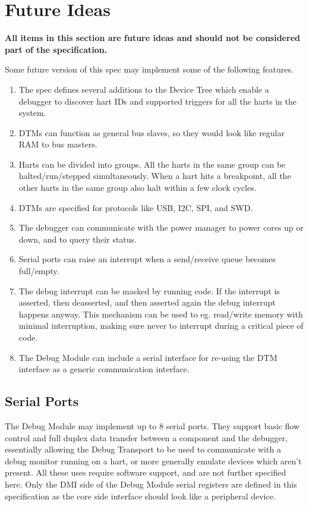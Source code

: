 \chapter{Future Ideas}
\label{sec:future}

\textbf{All items in this section are future ideas and should not be considered part of the specification.}

Some future version of this spec may implement some of the following features.

\begin{enumerate}
   \item The spec defines several additions to the Device Tree which enable a
      debugger to discover hart IDs and supported triggers for all the harts
      in the system.
   \item DTMs can function as general bus slaves, so they would look like
      regular RAM to bus masters.
   \item Harts can be divided into groups. All the harts in the same group can
      be halted/run/stepped simultaneously. When a hart hits a breakpoint, all
      the other harts in the same group also halt within a few clock cycles.
   \item DTMs are specified for protocols like USB, I2C, SPI, and SWD.
   \item The debugger can communicate with the power manager to power cores up
      or down, and to query their status.
   \item Serial ports can raise an interrupt when a send/receive queue becomes full/empty.
   \item The debug interrupt can be masked by running code. If the interrupt is
      asserted, then deasserted, and then asserted again the debug interrupt
      happens anyway. This mechanism can be used to eg. read/write memory with
      minimal interruption, making sure never to interrupt during a critical
      piece of code.
   \item The Debug Module can include a serial interface for re-using
      the DTM interface as a generic communication interface.
\end{enumerate}

\section{Serial Ports}

The Debug Module may implement up to 8 serial ports. They support basic flow
control and full duplex data transfer between a component and the debugger,
essentially allowing the Debug Transport to be used to communicate
with a debug monitor running on a hart, or more generally emulate devices which
aren't present. All these uses require software support, and are not further specified here.
Only the DMI side of the Debug Module serial registers are defined in this
specification as the core side interface should look like a peripheral device.


